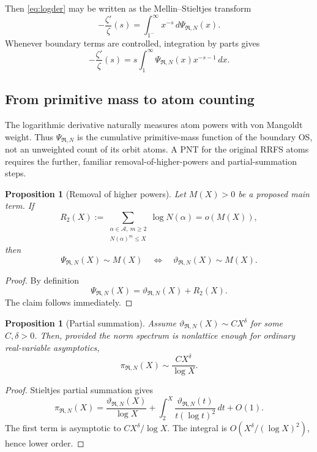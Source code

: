 \documentclass[11pt]{article}
\newtheorem{proposition}[theorem]{Proposition}
\newcommand{\cA}{\mathcal A}
\newcommand{\cR}{\mathfrak R}
\begin{document}
Then \eqref{eq:logder} may be written as the Mellin--Stieltjes transform
\begin{equation}\label{eq:stieltjes}
-\frac{\zeta'}{\zeta}(s)
=\int_{1^-}^{\infty}x^{-s}\,d\Psi_{\cR,N}(x).
\end{equation}
Whenever boundary terms are controlled, integration by parts gives
\begin{equation}\label{eq:ibp}
-\frac{\zeta'}{\zeta}(s)
=s\int_1^{\infty}\Psi_{\cR,N}(x)x^{-s-1}\,dx.
\end{equation}

\subsection{From primitive mass to atom counting}

The logarithmic derivative naturally measures atom powers with von Mangoldt weight. Thus $\Psi_{\cR,N}$ is the cumulative primitive-mass function of the boundary OS, not an unweighted count of its orbit atoms. A PNT for the original RRFS atoms requires the further, familiar removal-of-higher-powers and partial-summation steps.

\begin{proposition}[Removal of higher powers]\label{prop:powers}
Let $M(X)>0$ be a proposed main term. If
\[
R_2(X):=
\sum_{\substack{\alpha\in\cA,\ m\ge2\\N(\alpha)^m\le X}}
\log N(\alpha)
=o(M(X)),
\]
then
\[
\Psi_{\cR,N}(X)\sim M(X)
\quad\Longleftrightarrow\quad
\vartheta_{\cR,N}(X)\sim M(X).
\]
\end{proposition}

\begin{proof}
By definition
\[
\Psi_{\cR,N}(X)=\vartheta_{\cR,N}(X)+R_2(X).
\]
The claim follows immediately.
\end{proof}

\begin{proposition}[Partial summation]\label{prop:partial}
Assume $\vartheta_{\cR,N}(X)\sim C X^\delta$ for some $C,\delta>0$. Then, provided the norm spectrum is nonlattice enough for ordinary real-variable asymptotics,
\[
\boxed{\pi_{\cR,N}(X)\sim \frac{C X^\delta}{\log X}.}
\]
\end{proposition}

\begin{proof}
Stieltjes partial summation gives
\[
\pi_{\cR,N}(X)
=\frac{\vartheta_{\cR,N}(X)}{\log X}
+\int_{2}^{X}\frac{\vartheta_{\cR,N}(t)}{t(\log t)^2}\,dt
+O(1).
\]
The first term is asymptotic to $CX^\delta/\log X$. The integral is $O(X^\delta/(\log X)^2)$, hence lower order.
\end{proof}
\end{document}
